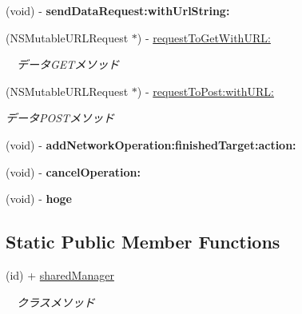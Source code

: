 \begin{DoxyCompactItemize}
\item 
\hypertarget{interface_r_c_network_manager_a29890f5e5fb0328b56c47f0119fa158b}{(void) -\/ {\bfseries send\-Data\-Request\-:with\-Url\-String\-:}}\label{interface_r_c_network_manager_a29890f5e5fb0328b56c47f0119fa158b}

\item 
\hypertarget{interface_r_c_network_manager_aee5a065702814748028793b61ce775a1}{(N\-S\-Mutable\-U\-R\-L\-Request $\ast$) -\/ \hyperlink{interface_r_c_network_manager_aee5a065702814748028793b61ce775a1}{request\-To\-Get\-With\-U\-R\-L\-:}}\label{interface_r_c_network_manager_aee5a065702814748028793b61ce775a1}

\begin{DoxyCompactList}\small\item\em 　データ\-G\-E\-Tメソッド \end{DoxyCompactList}\item 
\hypertarget{interface_r_c_network_manager_a62244264b732ed3bc3ad277ecfe43589}{(N\-S\-Mutable\-U\-R\-L\-Request $\ast$) -\/ \hyperlink{interface_r_c_network_manager_a62244264b732ed3bc3ad277ecfe43589}{request\-To\-Post\-:with\-U\-R\-L\-:}}\label{interface_r_c_network_manager_a62244264b732ed3bc3ad277ecfe43589}

\begin{DoxyCompactList}\small\item\em データ\-P\-O\-S\-Tメソッド \end{DoxyCompactList}\item 
\hypertarget{interface_r_c_network_manager_a7715b60bb47078f96c8d78de889da99e}{(void) -\/ {\bfseries add\-Network\-Operation\-:finished\-Target\-:action\-:}}\label{interface_r_c_network_manager_a7715b60bb47078f96c8d78de889da99e}

\item 
\hypertarget{interface_r_c_network_manager_acabda12dbe916d1f8aebd3892d6afa6c}{(void) -\/ {\bfseries cancel\-Operation\-:}}\label{interface_r_c_network_manager_acabda12dbe916d1f8aebd3892d6afa6c}

\item 
\hypertarget{interface_r_c_network_manager_a578ce70b156d204a78451741e109011a}{(void) -\/ {\bfseries hoge}}\label{interface_r_c_network_manager_a578ce70b156d204a78451741e109011a}

\end{DoxyCompactItemize}
\subsection*{Static Public Member Functions}
\begin{DoxyCompactItemize}
\item 
(id) + \hyperlink{interface_r_c_network_manager_a3bd5a7631dcdd77985e927dcc5275f39}{shared\-Manager}
\begin{DoxyCompactList}\small\item\em 　クラスメソッド \end{DoxyCompactList}\end{DoxyCompactItemize}
